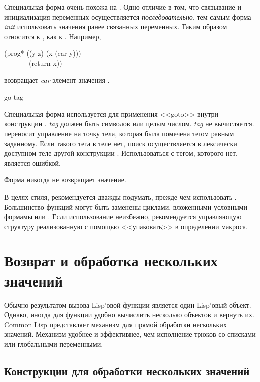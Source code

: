 \begin{defmac}
Специальная форма  очень похожа на . Одно отличие в том,
что связывание и инициализация переменных осуществляется \emph{последовательно},
тем самым форма \emph{init} использовать значения ранее связанных переменных.
Таким образом  относится к , как  к .
Например,
\begin{lisp}
(prog* ((y z) (x (car y))) \\
~~~~~~~(return x))
\end{lisp}
возвращает \emph{car} элемент значения .
\end{defmac}

\begin{defspec}
go tag

Специальная форма  используется для применения <<goto>>
внутри конструкции . \emph{tag} должен быть символов или целым
числом. \emph{tag} не вычисляется.
 переносит управление на точку тела, которая была помечена тегом равным
 заданному. Если такого тега в теле нет, поиск осуществляется в
лексически доступном теле другой конструкции .
Использоваться  с тегом, которого нет, является ошибкой.

Форма  никогда не возвращает значение.

В целях стиля, рекомендуется дважды подумать, прежде чем использовать
. Большинство функций  могут быть заменены циклами, вложенными
условными формамы или . Если использование  неизбежно,
рекомендуется управляющую структуру реализованную с помощью  <<упаковать>>
в определении макроса. 
\end{defspec}

\section{Возврат и обработка нескольких значений}

Обычно результатом вызова Lisp'овой функции является один Lisp'овый объект.
Однако, иногда для функции удобно вычислить несколько объектов и вернуть их.
Common Lisp представляет механизм для прямой обработки нескольких значений.
Механизм удобнее и эффективнее, чем исполнение трюков со списками или
глобальными переменными.

\subsection{Конструкции для обработки нескольких значений}

